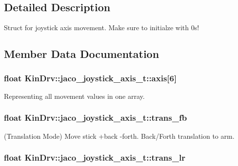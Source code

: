 \subsection{Detailed Description}
Struct for joystick axis movement. Make sure to initialze with 0s! 

\subsection{Member Data Documentation}
\hypertarget{structKinDrv_1_1jaco__joystick__axis__t_a8fe8ca2ba13fc2f6f050122bd60018c4}{
\subsubsection[{axis}]{\setlength{\rightskip}{0pt plus 5cm}float Kin\+Drv\+::jaco\+\_\+joystick\+\_\+axis\+\_\+t\+::axis\mbox{[}6\mbox{]}}}\label{structKinDrv_1_1jaco__joystick__axis__t_a8fe8ca2ba13fc2f6f050122bd60018c4}
Representing all movement values in one array. \hypertarget{structKinDrv_1_1jaco__joystick__axis__t_aee64ec9f9d7854b4823cdfc2c6385e43}{
\subsubsection[{trans\+\_\+fb}]{\setlength{\rightskip}{0pt plus 5cm}float Kin\+Drv\+::jaco\+\_\+joystick\+\_\+axis\+\_\+t\+::trans\+\_\+fb}}\label{structKinDrv_1_1jaco__joystick__axis__t_aee64ec9f9d7854b4823cdfc2c6385e43}
(Translation Mode) Move stick +back -\/forth. Back/\+Forth translation to arm. \hypertarget{structKinDrv_1_1jaco__joystick__axis__t_a196af681363c2d1d80735df74885af21}{
\subsubsection[{trans\+\_\+lr}]{\setlength{\rightskip}{0pt plus 5cm}float Kin\+Drv\+::jaco\+\_\+joystick\+\_\+axis\+\_\+t\+::trans\+\_\+lr}}\label{structKinDrv_1_1jaco__joystick__axis__t_a196af681363c2d1d80735df74885af21}
